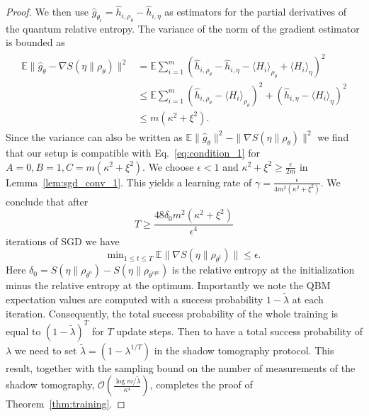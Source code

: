 \documentclass[
    aps,
    prx,
    onecolumn
]{revtex4-2}
\begin{document}
\begin{proof}
We then use $\hat{g}_{\theta_i} = \hat{h}_{i, \rho_\theta} - \hat{h}_{i, \eta}$ as estimators for the partial derivatives of the quantum relative entropy. The variance of the norm of the gradient estimator is bounded as
\begin{align}
\begin{split}
\label{eq:grad_bounded_variance}
    \mathbb{E} \|\hat{g}_\theta - \nabla S(\eta \|\rho_\theta) \|^2 &=
    \mathbb{E} \sum_{i=1}^m (\hat{h}_{i, \rho_\theta} - \hat{h}_{i, \eta} - \langle H_i \rangle_{\rho_\theta} + \langle H_i\rangle_\eta )^2 \\
    &\leq \mathbb{E}\sum_{i=1}^m (\hat{h}_{i, \rho_\theta} - \langle H_i \rangle_{\rho_\theta} )^2 + (\hat{h}_{i, \eta} - \langle H_i\rangle_\eta )^2 \\
    &\leq m ( \kappa^2 + \xi^2).
\end{split}
\end{align} 
Since the variance can also be written as $\mathbb{E} \|\hat{g}_\theta \|^2 - \| \nabla S(\eta \|\rho_\theta) \|^2$ we find that our setup is compatible with Eq.~\eqref{eq:condition_1} for $A=0, B=1, C=m ( \kappa^2 + \xi^2)$. We choose $\epsilon<1$ and $\kappa^2 + \xi^2 \geq \frac{\epsilon}{2m}$ in Lemma~\ref{lem:sgd_conv_1}. This yields a learning rate of $\gamma = \frac{\epsilon}{ 4 m^2 (\kappa^2 + \xi^2)}$. We conclude that after 
\begin{equation}
    T \geq \frac{48 \delta_0 m^2 ( \kappa^2 + \xi^2)}{\epsilon^4}
\end{equation}
iterations of SGD we have
\begin{equation}
    \mathrm{min}_{1\leq t \leq T} \; \mathbb{E}\|\nabla S(\eta \|\rho_{\theta^t}) \| \leq \epsilon. 
\end{equation} 
Here $\delta_0 = S(\eta\|\rho_{\theta^0})-S(\eta\|\rho_{\theta^\mathrm{opt}})$ is the relative entropy at the initialization minus the relative entropy at the optimum. Importantly we note the QBM expectation values are computed with a success probability $1-\tilde{\lambda}$ at each iteration. Consequently, the total success probability of the whole training is equal to $(1-\tilde{\lambda})^T$ for $T$ update steps. Then to have a total success probability of $\lambda$ we need to set $\tilde{\lambda}=(1-\lambda^{1/T})$ in the shadow tomography protocol. This result, together with the sampling bound on the number of measurements of the shadow tomography, $\mathcal{O}(\frac{\log{m/\tilde{\lambda}}}{\kappa^4})$, completes the proof of Theorem~\ref{thm:training}.
\end{proof}
\end{document}
